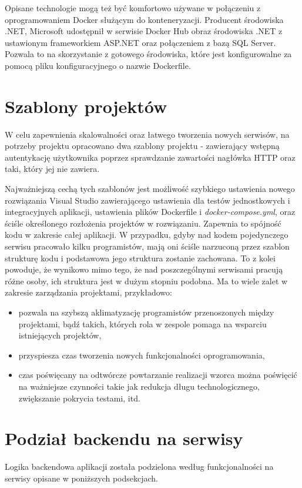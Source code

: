 \documentclass{SGGW-thesis}
\begin{document}
  Opisane technologie mogą też być komfortowo używane w połączeniu z oprogramowaniem Docker służącym do konteneryzacji. Producent środowiska .NET, Microsoft udostępnił w serwisie Docker Hub obraz środowiska .NET z ustawionym frameworkiem ASP.NET oraz połączeniem z bazą SQL Server. Pozwala to na skorzystanie z gotowego środowiska, które jest konfigurowalne za pomocą pliku konfiguracyjnego o nazwie Dockerfile.

  \section{Szablony projektów}
  W celu zapewnienia skalowalności oraz łatwego tworzenia nowych serwisów, na potrzeby projektu opracowano dwa szablony projektu - zawierający wstępną autentykację użytkownika poprzez sprawdzanie zawartości nagłówka HTTP oraz taki, który jej nie zawiera.

  Najważniejszą cechą tych szablonów jest możliwość szybkiego ustawienia nowego rozwiązania Visual Studio zawierającego ustawienia dla testów jednostkowych i integracyjnych aplikacji, ustawienia plików Dockerfile i \textit{docker-compose.yml}, oraz ściśle określonego rozłożenia projektów w rozwiązaniu. Zapewnia to spójność kodu w zakresie całej aplikacji. W przypadku, gdyby nad kodem pojedynczego serwisu pracowało kilku programistów, mają oni ściśle narzuconą przez szablon strukturę kodu i podstawowa jego struktura zostanie zachowana. To z kolei powoduje, że wynikowo mimo tego, że nad poszczególnymi serwisami pracują różne osoby, ich struktura jest w dużym stopniu podobna. Ma to wiele zalet w zakresie zarządzania projektami, przykładowo:

  \begin{itemize}
    \item pozwala na szybszą aklimatyzację programistów przenoszonych między projektami, bądź takich, których rola w zespole pomaga na wsparciu istniejących projektów,
    \item przyspiesza czas tworzenia nowych funkcjonalności oprogramowania,
    \item czas poświęcany na odtwórcze powtarzanie realizacji wzorca można poświęcić na ważniejsze czynności takie jak redukcja długu technologicznego, zwiększanie pokrycia testami, itd.
  \end{itemize}

  \section{Podział backendu na serwisy}
    Logika backendowa aplikacji została podzielona według funkcjonalności na serwisy opisane w poniższych podsekcjach.
\end{document}
